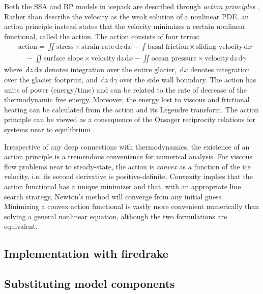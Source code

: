 \documentclass{article}
\theoremstyle{definition}
\theoremstyle{plain}
\newcommand{\ud}{\hspace{2pt}\mathrm{d}}
\begin{document}
Both the SSA and BP models in icepack are described through \emph{action principles} \citep{dukowicz2010consistent}.
Rather than describe the velocity as the weak solution of a nonlinear PDE, an action principle instead states that the velocity minimizes a certain nonlinear functional, called the action.
The action consists of four terms:
\begin{align}
    & \text{action} = \iint\text{stress} \times \text{strain rate}\ud z\ud x - \int\text{basal friction} \times \text{sliding velocity}\ud x \nonumber \\
    & \quad - \iint\text{surface slope}\times\text{velocity}\ud z\ud x - \iint\text{ocean pressure}\times\text{velocity}\ud z\ud \gamma
    \label{action-functional}
\end{align}
where $\ud z\ud x$ denotes integration over the entire glacier, $\ud x$ denotes integration over the glacier footprint, and $\ud z\ud\gamma$ over the side wall boundary.
The action has units of power (energy/time) and can be related to the rate of decrease of the thermodynamic free energy.
Moreover, the energy lost to viscous and frictional heating can be calculated from the action and its Legendre transform.
The action principle can be viewed as a consequence of the Onsager reciprocity relations for systems near to equilibrium \citep{de2013non}.

Irrespective of any deep connections with thermodynamics, the existence of an action principle is a tremendous convenience for numerical analysis.
For viscous flow problems near to steady-state, the action is \emph{convex} as a function of the ice velocity, i.e. its second derivative is positive-definite.
Convexity implies that the action functional has a unique minimizer and that, with an appropriate line search strategy, Newton's method will converge from any initial guess.
Minimizing a convex action functional is vastly more convenient numerically than solving a general nonlinear equation, although the two formulations are equivalent.


\subsection{Implementation with firedrake}

\subsection{Substituting model components}
\end{document}
